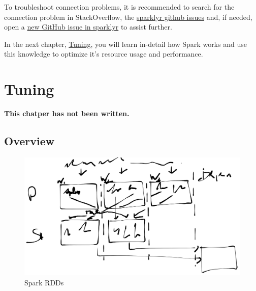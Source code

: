 \documentclass[]{book}
\theoremstyle{definition}
\theoremstyle{definition}
\theoremstyle{definition}
\theoremstyle{remark}
\begin{document}
To troubleshoot connection problems, it is recommended to search for the
connection problem in StackOverflow, the
\href{https://github.com/rstudio/sparklyr/issues}{sparklyr github
issues} and, if needed, open a
\href{https://github.com/rstudio/sparklyr/issues/new}{new GitHub issue
in sparklyr} to assist further.

In the next chapter, \protect\hyperlink{tuning}{Tuning}, you will learn
in-detail how Spark works and use this knowledge to optimize it's
resource usage and performance.

\hypertarget{tuning}{%
\chapter{Tuning}\label{tuning}}

\textbf{This chatper has not been written.}

\hypertarget{overview-3}{%
\section{Overview}\label{overview-3}}

\begin{figure}

{\centering \includegraphics[width=29.36in]{images/07-tuning-spark-rdds} 

}

\caption{Spark RDDs}\label{fig:unnamed-chunk-57}
\end{figure}
\end{document}
